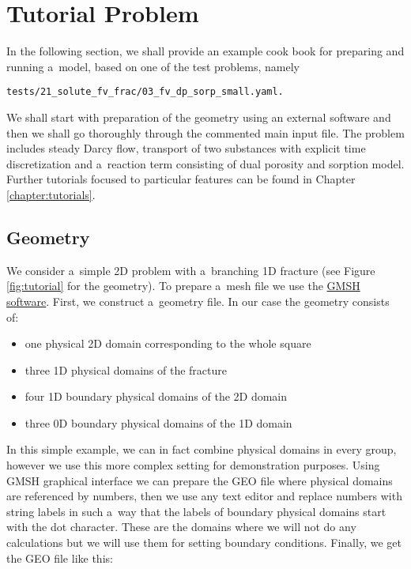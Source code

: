 

\section{Tutorial Problem}
In the following section, we shall provide an example cook book for preparing and running a~model,
based on one of the test problems, namely
\begin{verbatim}
tests/21_solute_fv_frac/03_fv_dp_sorp_small.yaml.
\end{verbatim}
We shall start with preparation of the geometry using an external software and then we shall go thoroughly through the 
commented main input file. The problem includes steady Darcy flow, transport of two substances with explicit
time discretization and a~reaction term consisting of dual porosity and sorption model.
Further tutorials focused to particular features can be found in Chapter \ref{chapter:tutorials}.

\subsection{Geometry}
We consider a~simple 2D problem with a~branching 1D fracture (see Figure \ref{fig:tutorial} for the geometry). 
To prepare a~mesh file we use the \href{http://geuz.org/gmsh/}{GMSH software}.
First, we construct a~geometry file. In our case the geometry consists of: 
\begin{itemize}
 \item one physical 2D domain corresponding to the whole square
 \item three 1D physical domains of the fracture
 \item four 1D boundary physical domains of the 2D domain
 \item three 0D boundary physical domains of the 1D domain
\end{itemize}
In this simple example, we can in fact combine physical domains in every group, however we use this more complex setting for
demonstration purposes. Using GMSH graphical interface we can prepare the GEO file where physical domains are referenced by numbers, then we use 
any text editor and replace numbers with string labels in such a~way that the labels of boundary physical domains start with the dot character. 
These are the domains where we will not do any calculations but we will use them for setting boundary conditions.
Finally, we get the GEO file like this:

